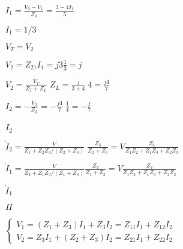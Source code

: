 \documentclass{article}
\def\lthtmlcheckvsize{\ifdim\ht\sizebox<\vsize 
  \ifdim\wd\sizebox<\hsize\expandafter\hfill\fi \expandafter\vfill
  \else\expandafter\vss\fi}%
\begin{document}
{\newpage\clearpage
{}%
$\displaystyle I_1=\frac{V_0-V_1}{Z_0}=\frac{3-4I_1}{5}$%
\lthtmlindisplaymathZ
\lthtmlcheckvsize\clearpage}

{\newpage\clearpage
{}%
$ I_1=1/3$%
\lthtmlindisplaymathZ
\lthtmlcheckvsize\clearpage}

{\newpage\clearpage
{}%
$ V_T=V_2$%
\lthtmlindisplaymathZ
\lthtmlcheckvsize\clearpage}

{\newpage\clearpage
{}%
$\displaystyle V_2=Z_{21}I_1=j3 \frac{1}{3}=j$%
\lthtmlindisplaymathZ
\lthtmlcheckvsize\clearpage}

{\newpage\clearpage
{}%
$\displaystyle V_2=\frac{V_T}{Z_T+Z_L}\;Z_L=\frac{j}{3+4}\;4=\frac{j4}{7}$%
\lthtmlindisplaymathZ
\lthtmlcheckvsize\clearpage}

{\newpage\clearpage
{}%
$\displaystyle I_2=-\frac{V_2}{Z_L}=-\frac{j4}{7}\;\frac{1}{4}=-\frac{j}{7}$%
\lthtmlindisplaymathZ
\lthtmlcheckvsize\clearpage}

{\newpage\clearpage
{}%
$ \dot{I}_2$%
\lthtmlindisplaymathZ
\lthtmlcheckvsize\clearpage}

{\newpage\clearpage
{}%
$\displaystyle \dot{I}_2=\frac{V}{Z_1+Z_2 Z_3/(Z_2+Z_3)}\;\frac{Z_3}{Z_2+Z_3}
=V \frac{Z_3}{Z_1Z_2+Z_1Z_3+Z_2Z_3}$%
\lthtmlindisplaymathZ
\lthtmlcheckvsize\clearpage}

{\newpage\clearpage
{}%
$\displaystyle \dot{I}_1=\frac{V}{Z_2+Z_1 Z_3/(Z_1+Z_3)}\frac{Z_3}{Z_1+Z_3}
=V \frac{Z_3}{Z_1Z_2+Z_1Z_3+Z_2Z_3}$%
\lthtmlindisplaymathZ
\lthtmlcheckvsize\clearpage}

{\newpage\clearpage
{}%
$ \dot{I}_1$%
\lthtmlindisplaymathZ
\lthtmlcheckvsize\clearpage}

{\newpage\clearpage
{}%
$ \Pi$%
\lthtmlindisplaymathZ
\lthtmlcheckvsize\clearpage}

{\newpage\clearpage
{}%
$\displaystyle \left\{ \begin{array}{l} V_1=(Z_1+Z_3)I_1+Z_3I_2=Z_{11}I_1+Z_{12}I_2 \\
V_2=Z_3I_1+(Z_2+Z_3)I_2=Z_{21}I_1+Z_{22}I_2  \end{array} \right.$%
\lthtmlindisplaymathZ
\lthtmlcheckvsize\clearpage}
\end{document}
